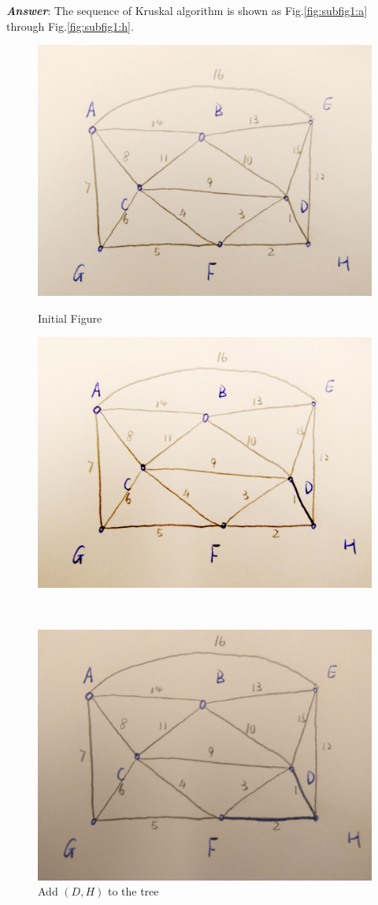 \documentclass[11pt]{article}
\begin{document}
\noindent \textbf{\emph{Answer}}: The sequence of Kruskal algorithm is shown as Fig.\ref{fig:subfig1:a} through Fig.\ref{fig:subfig1:h}.
\begin{figure}[H]
	\begin{minipage}[t]{0.50\linewidth}
		\centering
		\includegraphics[width=0.85\linewidth]{Figure/1a1.jpg}
		\caption{Initial Figure}
		\label{fig:subfig1:a}
	\end{minipage}
	\begin{minipage}[t]{0.50\linewidth}
		\centering
		\includegraphics[width=0.85\linewidth]{Figure/1a2.jpg}
		\caption{Add $(D,H)$ to the tree}
		\label{fig:subfig1:b}
	\end{minipage}
\\
	\begin{minipage}[t]{0.50\linewidth}
		\centering
		\includegraphics[width=0.85\linewidth]{Figure/1a3.jpg}

\end{minipage}
\end{figure}
\end{document}

